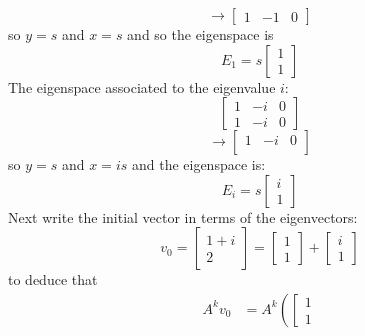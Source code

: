 \documentclass{article}
\begin{document}
\begin{Answer}
\begin{equation*}
  \rightarrow\left[
  \begin{array}{cc|c}
  1&-1&0
  \end{array}
  \right]
  \end{equation*}
  so $y=s$ and $x = s$ and so the eigenspace is
  \begin{equation*}
  E_1 = s \left[
  \begin{array}{c}
  1\\
  1
  \end{array}
  \right]
  \end{equation*}
  The eigenspace associated to the eigenvalue $i$:
  \begin{equation*}
  \left[
  \begin{array}{cc|c}
  1&-i&0\\
  1&-i&0
  \end{array}
  \right]
  \end{equation*}
  \begin{equation*}
  \rightarrow\left[
  \begin{array}{cc|c}
  1&-i&0\\
  \end{array}
  \right]
  \end{equation*}
  so $y = s$ and $x = is$ and the eigenspace is:
  \begin{equation*}
  E_i = s \left[
  \begin{array}{c}
  i\\
  1
  \end{array}
  \right]
  \end{equation*}
  Next write the initial vector in terms of the eigenvectors:
  \begin{equation*}
  v_0 = \left[
  \begin{array}{c}
  1+i\\
  2
  \end{array}
  \right] = \left[
  \begin{array}{c}
  1\\
  1
  \end{array}
  \right] + \left[
  \begin{array}{c}
  i\\
  1
  \end{array}
  \right]
  \end{equation*}
  to deduce that 
  \begin{align*}
  A^k v_0 &= A^k \left( \left[
  \begin{array}{c}
  1\\
  1
  \end{array}

\end{align*}
\end{Answer}
\end{document}
